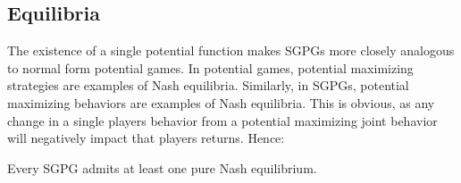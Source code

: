 \subsection{Equilibria}

The existence of a single potential function makes SGPGs more closely analogous to normal form potential games. In potential games, potential maximizing strategies are examples of Nash equilibria. Similarly, in SGPGs, potential maximizing behaviors are examples of Nash equilibria. This is obvious, as any change in a single players behavior from a potential maximizing joint behavior will negatively impact that players returns. Hence:

\begin{thm}
Every SGPG admits at least one pure Nash equilibrium.
\end{thm}


